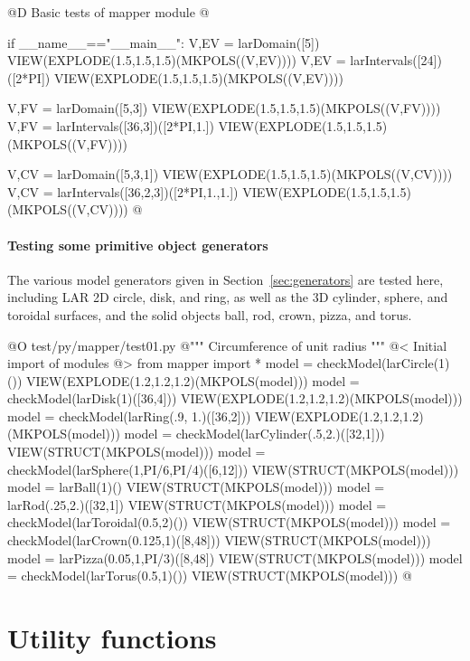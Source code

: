 \documentclass[11pt,oneside]{article}	%
\begin{document}
@D Basic tests of mapper module
@{if __name__=="__main__":
	V,EV = larDomain([5])
	VIEW(EXPLODE(1.5,1.5,1.5)(MKPOLS((V,EV))))
	V,EV = larIntervals([24])([2*PI])
	VIEW(EXPLODE(1.5,1.5,1.5)(MKPOLS((V,EV))))
		
	V,FV = larDomain([5,3])
	VIEW(EXPLODE(1.5,1.5,1.5)(MKPOLS((V,FV))))
	V,FV = larIntervals([36,3])([2*PI,1.])
	VIEW(EXPLODE(1.5,1.5,1.5)(MKPOLS((V,FV))))
		
	V,CV = larDomain([5,3,1])
	VIEW(EXPLODE(1.5,1.5,1.5)(MKPOLS((V,CV))))
	V,CV = larIntervals([36,2,3])([2*PI,1.,1.])
	VIEW(EXPLODE(1.5,1.5,1.5)(MKPOLS((V,CV))))
@}

\paragraph{Testing some primitive object generators}
The various model generators given in Section~\ref{sec:generators} are tested here, including LAR 2D circle, disk, and ring, as well as the 3D cylinder, sphere, and toroidal surfaces, and the solid objects ball, rod, crown, pizza, and torus.

@O test/py/mapper/test01.py
@{""" Circumference of unit radius """
@< Initial import of modules @>
from mapper import *
model = checkModel(larCircle(1)())
VIEW(EXPLODE(1.2,1.2,1.2)(MKPOLS(model)))
model = checkModel(larDisk(1)([36,4]))
VIEW(EXPLODE(1.2,1.2,1.2)(MKPOLS(model)))
model = checkModel(larRing(.9, 1.)([36,2]))
VIEW(EXPLODE(1.2,1.2,1.2)(MKPOLS(model)))
model = checkModel(larCylinder(.5,2.)([32,1]))
VIEW(STRUCT(MKPOLS(model)))
model = checkModel(larSphere(1,PI/6,PI/4)([6,12]))
VIEW(STRUCT(MKPOLS(model)))
model = larBall(1)()
VIEW(STRUCT(MKPOLS(model)))
model = larRod(.25,2.)([32,1])
VIEW(STRUCT(MKPOLS(model)))
model = checkModel(larToroidal(0.5,2)())
VIEW(STRUCT(MKPOLS(model)))
model = checkModel(larCrown(0.125,1)([8,48]))
VIEW(STRUCT(MKPOLS(model)))
model = larPizza(0.05,1,PI/3)([8,48])
VIEW(STRUCT(MKPOLS(model)))
model = checkModel(larTorus(0.5,1)())
VIEW(STRUCT(MKPOLS(model)))
@}


\appendix
\section{Utility functions}
\end{document}
